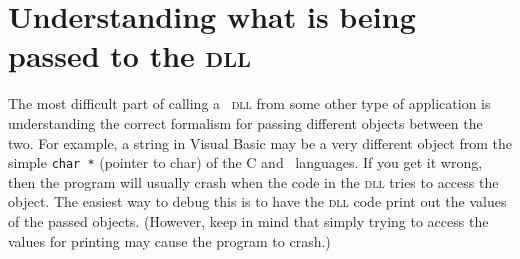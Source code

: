 \section{Understanding what is being passed to the \textsc{dll}}

The most difficult part of calling a \cplus\ \textsc{dll} from some other
type of application is understanding the correct formalism 
for passing different objects between the two.
For example, a string in Visual Basic
may be a very different object from the simple \texttt{char *}
(pointer to char) of the C and \cplus\ languages. If you get it wrong,
then the program will usually crash when the code in the \textsc{dll}
tries to access the object.  The easiest way to debug this is
to have the \textsc{dll} code print out the values of the passed
objects. (However, keep in mind that simply trying to access the
values for printing may cause the program to crash.)

